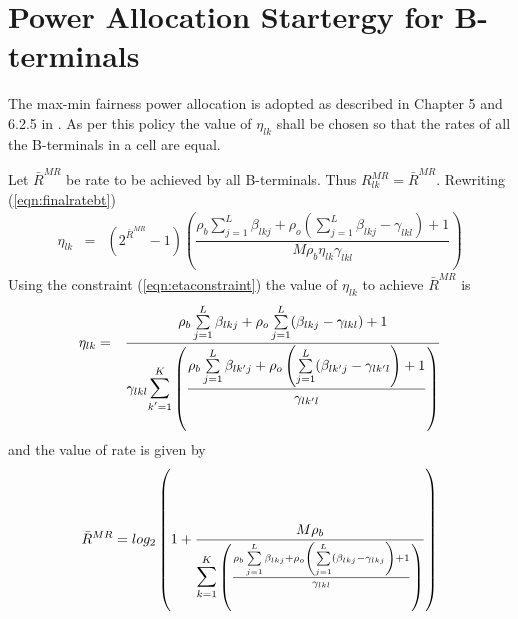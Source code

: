 \documentclass[10pt, a4paper, twoside,fleqn]{article}
\begin{document}
\section{Power Allocation Startergy for B-terminals}
The max-min fairness power allocation is adopted as described in Chapter 5 and 6.2.5 in \cite{bib:MassiveMimoBook}. As per this policy the value of $\eta_{lk}$ shall be chosen so that the rates of all the B-terminals in a cell are equal. 

Let $\bar{R}^{MR}$ be rate to be achieved by all B-terminals. Thus $R_{lk}^{MR} = \bar{R}^{MR}$. Rewriting (\ref{eqn:finalratebt})
\begin{eqnarray}
    \eta_{lk} &=& (2^{\bar{R}^{MR}} - 1)\left(\dfrac{\rho_b\sum\limits_{j=1}^{L}\beta_{lkj}+\rho_o\left(\sum\limits_{j=1}^{L}\beta_{lkj} -\gamma_{lkl}\right)+1}{M\rho_b\eta_{lk}\gamma_{lkl}}\right)
\end{eqnarray}
Using the constraint (\ref{eqn:etaconstraint}) the value of $\eta_{lk}$ to achieve $\bar{R}^{MR}$ is
\begin{eqnarray}
    \eta_{lk} &=& \frac{\rho_b\sum\limits_{j=1}^{L}\beta_{lkj}+\rho_o\sum\limits_{j=1}^{L}(\beta_{lkj} -\gamma_{lkl})+1}{\gamma_{lkl}\mathlarger{\mathlarger{\sum}}\limits_{k'=1}^{K}\left(\dfrac{\rho_b\sum\limits_{j=1}^{L}\beta_{lk'j}+\rho_o\left(\sum\limits_{j=1}^{L}(\beta_{lk'j} -\gamma_{lk'l}\right)+1}{\gamma_{lk'l}}\right)}
\end{eqnarray}
and the value of rate is given by
\begin{eqnarray}
    \bar{R}^{MR} =log_2\left(1+\frac{M\rho_b}{\mathlarger{\mathlarger{\sum}}\limits_{k=1}^{K}\left(\frac{\rho_b\sum\limits_{j=1}^{L}\beta_{lkj}+\rho_o\left(\sum\limits_{j=1}^{L}(\beta_{lkj} -\gamma_{lkj}\right)+1}{\gamma_{lkl}}\right)} \right)
\end{eqnarray}
  
\end{document}
